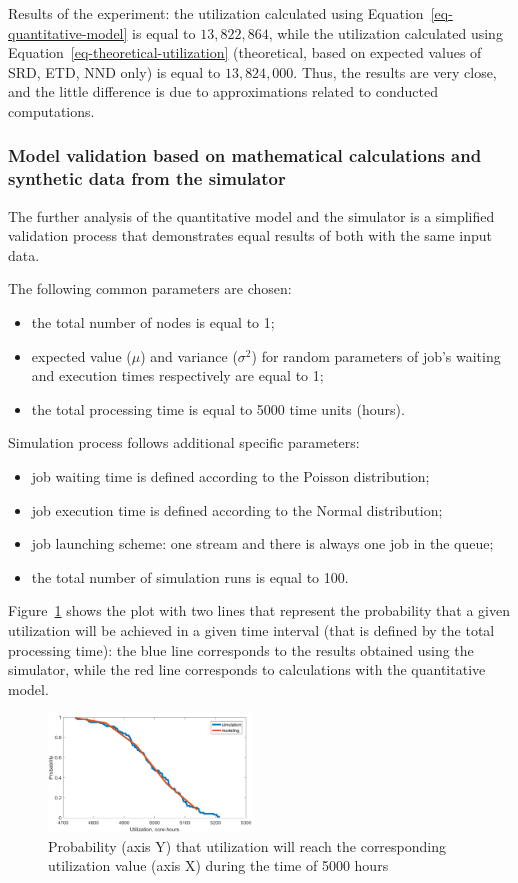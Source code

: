 Results of the experiment: the utilization calculated using Equation~\ref{eq-quantitative-model} is equal to $13,822,864$, while the utilization calculated using Equation~\ref{eq-theoretical-utilization} (theoretical, based on expected values of SRD, ETD, NND only) is equal to $13,824,000$. Thus, the results are very close, and the little difference is due to approximations related to conducted computations.


\subsubsection{Model validation based on mathematical calculations and synthetic data from the simulator} \label{sec-strategy-4-2}

The further analysis of the quantitative model and the simulator is a simplified validation process that demonstrates equal results of both with the same input data.

The following common parameters are chosen: 
\begin{itemize}
    \item the total number of nodes is equal to 1;
    \item expected value ($\mu$) and variance ($\sigma^2$) for random parameters of job's waiting and execution times respectively are equal to 1; 
    \item the total processing time is equal to 5000 time units (hours).
\end{itemize}

Simulation process follows additional specific parameters:
\begin{itemize}
    \item job waiting time is defined according to the Poisson distribution;
    \item job execution time is defined according to the Normal distribution;
    \item job launching scheme: one stream and there is always one job in the queue;
    \item the total number of simulation runs is equal to 100.
\end{itemize}
Figure~\ref{fig-simulation-and-modeling} shows the plot with two lines that represent the probability that a given utilization will be achieved in a given time interval (that is defined by the total processing time): the blue line corresponds to the results obtained using the simulator, while the red line corresponds to calculations with the quantitative model.

\begin{figure}
    \centering
    \includegraphics[width=0.48\textwidth]{pics/simulation-and-modeling.png}
    \caption{Probability (axis Y) that utilization will reach the corresponding utilization value (axis X) during the time of 5000 hours}
    \label{fig-simulation-and-modeling} 
\end{figure}
